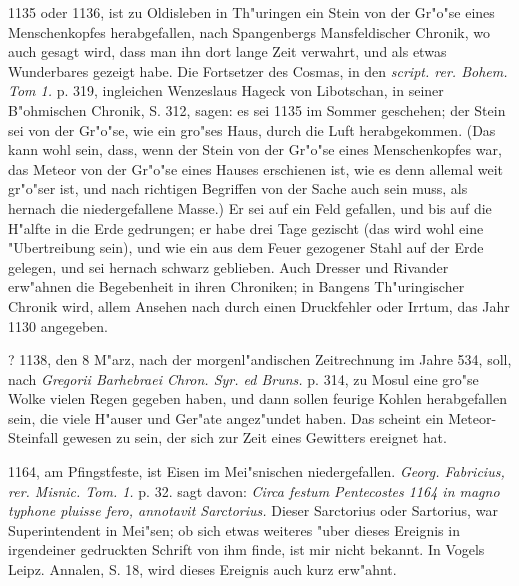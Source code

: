 \documentclass[a4paper, 11pt, oneside, polutonikogreek, german]{article}
\begin{document}
1135 oder 1136, ist zu Oldisleben in Th"uringen ein Stein von der Gr"o"se eines Menschenkopfes herabgefallen, nach Spangenbergs Mansfeldischer Chronik, wo auch gesagt wird, dass man ihn dort lange Zeit verwahrt, und als etwas Wunderbares gezeigt habe. Die Fortsetzer des Cosmas, in den \emph{script. rer. Bohem. Tom 1.} p. 319, ingleichen Wenzeslaus Hageck von Libotschan, in seiner B"ohmischen Chronik, S. 312, sagen: es sei 1135 im Sommer geschehen; der Stein sei von der Gr"o"se, wie ein gro"ses Haus, durch die Luft herabgekommen. (Das kann wohl sein, dass, wenn der Stein von der Gr"o"se eines Menschenkopfes war, das Meteor von der Gr"o"se eines Hauses erschienen ist, wie es denn allemal weit gr"o"ser ist, und nach richtigen Begriffen von der Sache auch sein muss, als hernach die niedergefallene Masse.) Er sei auf ein Feld gefallen, und bis auf die H"alfte in die Erde gedrungen; er habe drei Tage gezischt (das wird wohl eine "Ubertreibung sein), und wie ein aus dem Feuer gezogener Stahl auf der Erde gelegen, und sei hernach schwarz geblieben. Auch Dresser und Rivander erw"ahnen die Begebenheit in ihren Chroniken; in Bangens Th"uringischer Chronik wird, allem Ansehen nach durch einen Druckfehler oder Irrtum, das Jahr 1130 angegeben.

? 1138, den 8 M"arz, nach der morgenl"andischen Zeitrechnung im Jahre 534, soll, nach \emph{Gregorii Barhebraei Chron. Syr. ed Bruns.} p. 314, zu Mosul eine gro"se Wolke vielen Regen gegeben haben, und dann sollen feurige Kohlen herabgefallen sein, die viele H"auser und Ger"ate angez"undet haben. Das scheint ein Meteor-Steinfall gewesen zu sein, der sich zur Zeit eines Gewitters ereignet hat.

1164, am Pfingstfeste, ist Eisen im Mei"snischen niedergefallen. \emph{Georg. Fabricius, rer. Misnic. Tom. 1.} p. 32. sagt davon: \emph{Circa festum Pentecostes 1164 in magno typhone pluisse fero, annotavit Sarctorius.} Dieser Sarctorius oder Sartorius, war Superintendent in Mei"sen; ob sich etwas weiteres "uber dieses Ereignis in irgendeiner gedruckten Schrift von ihm finde, ist mir nicht bekannt. In Vogels Leipz. Annalen, S. 18, wird dieses Ereignis auch kurz erw"ahnt.
\end{document}
